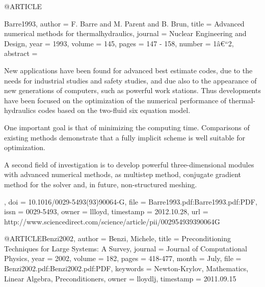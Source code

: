 @ARTICLE{Barre1993,
  author = {F. Barre and M. Parent and B. Brun},
  title = {Advanced numerical methods for thermalhydraulics},
  journal = {Nuclear Engineering and Design},
  year = {1993},
  volume = {145},
  pages = {147 - 158},
  number = {1â€“2},
  abstract = {New applications have been found for advanced best estimate codes,
	due to the needs for industrial studies and safety studies, and due
	also to the appearance of new generations of computers, such as powerful
	work stations. Thus developments have been focused on the optimization
	of the numerical performance of thermal-hydraulics codes based on
	the two-fluid six equation model.
	
	One important goal is that of minimizing the computing time. Comparisons
	of existing methods demonstrate that a fully implicit scheme is well
	suitable for optimization.
	
	A second field of investigation is to develop powerful three-dimensional
	modules with advanced numerical methods, as multistep method, conjugate
	gradient method for the solver and, in future, non-structured meshing.},
  doi = {10.1016/0029-5493(93)90064-G},
  file = {Barre1993.pdf:Barre1993.pdf:PDF},
  issn = {0029-5493},
  owner = {llloyd},
  timestamp = {2012.10.28},
  url = {http://www.sciencedirect.com/science/article/pii/002954939390064G}
}

@ARTICLE{Benzi2002,
  author = {Benzi, Michele},
  title = {Preconditioning Techniques for Large Systems: A Survey},
  journal = {Journal of Computational Physics},
  year = {2002},
  volume = {182},
  pages = {418-477},
  month = {July},
  file = {Benzi2002.pdf:Benzi2002.pdf:PDF},
  keywords = {Newton-Krylov, Mathematics, Linear Algebra, Preconditioners},
  owner = {lloydlj},
  timestamp = {2011.09.15}
}

